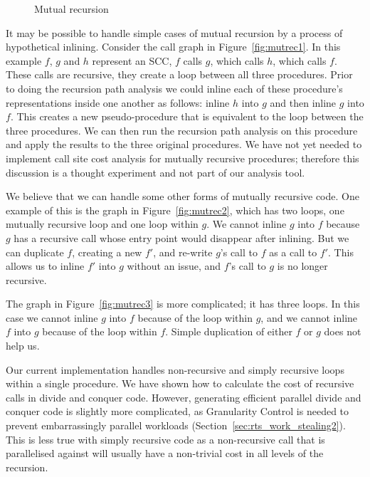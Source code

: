 \begin{figure}
\begin{center}
%
\hspace{0.09\textwidth}
%
%
\hspace{0.09\textwidth}
%
\end{center}
\caption{Mutual recursion}
\label{fig:mutrec}
\end{figure}

It may be possible to handle simple cases of mutual recursion by a process
of hypothetical inlining.
Consider the call graph in Figure~\ref{fig:mutrec1}.
In this example $f$, $g$ and $h$ represent an SCC,
$f$ calls $g$, which calls $h$, which calls $f$.
These calls are recursive, they create a loop between all three procedures.
Prior to doing the recursion path analysis we could inline each of these
procedure's representations inside one another as follows:
inline $h$ into $g$ and then inline $g$ into $f$.
This creates a new pseudo-procedure that is equivalent to the loop between the
three procedures.
We can then run the recursion path analysis on this procedure and apply the
results to the three original procedures.
We have not yet needed to implement call site cost analysis for mutually
recursive procedures;
therefore this discussion is a thought experiment and not part of our
analysis tool.

We believe that we can handle some other forms of mutually recursive code.
One example of this is  the graph in Figure~\ref{fig:mutrec2},
which has two loops, one mutually recursive loop and one loop within $g$.
We cannot inline $g$ into $f$ because $g$ has a recursive call whose
entry point would disappear after inlining.
But we can duplicate $f$, creating a new $f\prime$, and re-write $g$'s call
to $f$ as a call to $f\prime$.
This allows us to inline $f\prime$ into $g$ without an issue, and $f$'s call
to $g$ is no longer recursive.

The graph in Figure~\ref{fig:mutrec3} is more complicated;
it has three loops.
In this case we cannot inline $g$ into $f$ because of the loop within $g$,
and we cannot inline $f$ into $g$ because of the loop within $f$.
Simple duplication of either $f$ or $g$ does not help us.

Our current implementation handles non-recursive and simply recursive
loops within a single procedure.
We have shown how to calculate the cost of recursive calls in divide and
conquer code.
However, generating efficient parallel divide and conquer code is slightly
more complicated,
as Granularity Control is needed to prevent embarrassingly parallel
workloads (Section~\ref{sec:rts_work_stealing2}).
This is less true with simply recursive code as a non-recursive call that is
parallelised against will usually have a non-trivial cost in all levels of
the recursion.


